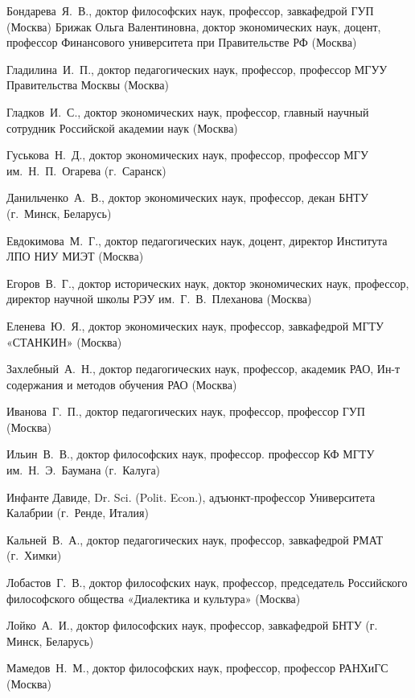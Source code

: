 \begin{multicols}{2}
\begin{flushleft}
    \noindent Бондарева Я. В., доктор философских наук, профессор, завкафедрой ГУП (Москва)
    Брижак Ольга Валентиновна, доктор экономических наук, доцент, профессор Финансового университета при Правительстве РФ (Москва)
    
    \noindent Гладилина И. П., доктор педагогических наук, профессор, профессор МГУУ Правительства Москвы (Москва)
    
    \noindent Гладков И. С., доктор экономических наук, профессор, главный научный сотрудник Российской академии наук (Москва)
    
    \noindent Гуськова Н. Д., доктор экономических наук, профессор, профессор МГУ им. Н. П. Огарева (г. Саранск)
    
    \noindent Данильченко А. В., доктор экономических наук, профессор, декан БНТУ (г. Минск, Беларусь)
    
    \noindent Евдокимова М. Г., доктор педагогических наук, доцент, директор Института ЛПО НИУ МИЭТ (Москва)
    
    \noindent Егоров В. Г., доктор исторических наук, доктор экономических наук, профессор, директор научной школы РЭУ им. Г. В. Плеханова (Москва)
   
    \noindent Еленева Ю. Я., доктор экономических наук, профессор, завкафедрой МГТУ «СТАНКИН» (Москва)
    
    \noindent Захлебный А. Н., доктор педагогических наук, профессор, академик РАО, Ин-т содержания и методов обучения РАО (Москва)
    
    \noindent Иванова Г. П., доктор педагогических наук, профессор, профессор ГУП (Москва)
    
    \noindent Ильин В. В., доктор философских наук, профессор. профессор КФ МГТУ им. Н. Э. Баумана (г. Калуга)
    
    \noindent Инфанте Давиде, Dr. Sci. (Polit. Econ.), адъюнкт-профессор Университета Калабрии (г. Ренде, Италия)
    
    \noindent Кальней В. А., доктор педагогических наук, профессор, завкафедрой РМАТ (г. Химки)
    
    \noindent Лобастов Г. В., доктор философских наук, профессор, председатель Российского философского общества «Диалектика и культура» (Москва)
    
    \noindent Лойко А. И., доктор философских наук, профессор, завкафедрой БНТУ (г. Минск, Беларусь)
    
    \noindent Мамедов Н. М., доктор философских наук, профессор, профессор РАНХиГС (Москва)
    

\end{flushleft}
\end{multicols}
